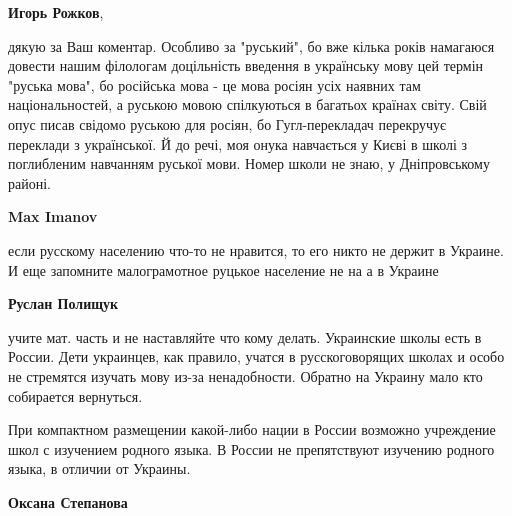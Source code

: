 \begin{itemize}
\begin{itemize}
 
\textbf{Игорь Рожков}, 

дякую за Ваш коментар. Особливо за "руський", бо вже кілька років намагаюся
довести нашим філологам доцільність введення в українську мову цей термін
"руська мова", бо російська мова - це мова росіян усіх наявних там
національностей, а руською мовою спілкуються в багатьох країнах світу. Свій
опус писав свідомо руською для росіян, бо Гугл-перекладач перекручує переклади
з української. Й до речі, моя онука навчається у Києві в школі з поглибленим
навчанням руської мови. Номер школи не знаю, у Дніпровському районі.


 
\textbf{Max Imanov} 

если русскому населению что-то не нравится, то его никто не держит в Украине. И
еще запомните малограмотное руцькое население не на а в Украине

 
\textbf{Руслан Полищук} 

учите мат. часть и не наставляйте что кому делать. Украинские школы есть в
России. Дети украинцев, как правило, учатся в русскоговорящих школах и особо не
стремятся изучать мову из-за ненадобности. Обратно на Украину мало кто
собирается вернуться.

При компактном размещении какой-либо нации в России возможно учреждение школ с
изучением родного языка. В России не препятствуют изучению родного языка, в
отличии от Украины.


 
\textbf{Оксана Степанова} 


\end{itemize}
\end{itemize}
